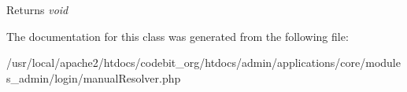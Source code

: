 \begin{DoxyReturn}{Returns}
{\itshape void} 
\end{DoxyReturn}


The documentation for this class was generated from the following file\-:\begin{DoxyCompactItemize}
\item 
/usr/local/apache2/htdocs/codebit\-\_\-org/htdocs/admin/applications/core/modules\-\_\-admin/login/manual\-Resolver.\-php\end{DoxyCompactItemize}
